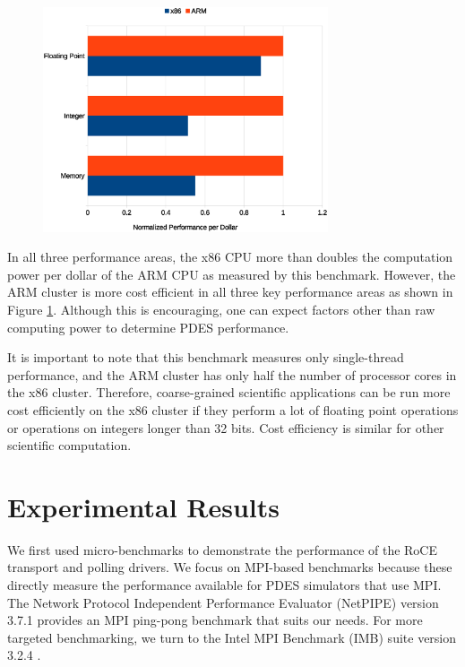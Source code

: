 \documentclass[11pt]{book}
\begin{document}
\begin{figure}
\centering
\includegraphics[width=0.75\textwidth]{nbench_cost}
\label{nbench-cost}
\end{figure}

In all three performance areas, the x86 CPU more than doubles the computation power per
dollar of the ARM CPU as measured by this benchmark.  However, the ARM cluster is more
cost efficient in all three key performance areas as shown in Figure
\ref{nbench-cost}. Although this is encouraging, one can expect factors other than raw
computing power to determine PDES performance.

It is important to note that this benchmark measures only single-thread performance, and
the ARM cluster has only half the number of processor cores in the x86 cluster. Therefore,
coarse-grained scientific applications can be run more cost efficiently on the x86 cluster
if they perform a lot of floating point operations or operations on integers longer than
32 bits. Cost efficiency is similar for other scientific computation.

\chapter{Experimental Results}\label{results}

We first used micro-benchmarks to demonstrate the performance of the RoCE transport and
polling drivers.  We focus on MPI-based benchmarks because these directly measure the
performance available for PDES simulators that use MPI.  The Network Protocol Independent
Performance Evaluator (NetPIPE) \cite{NetPIPE} version 3.7.1 provides an MPI ping-pong
benchmark that suits our needs.  For more targeted benchmarking, we turn to the Intel MPI
Benchmark (IMB) suite version 3.2.4 \cite{intel-mpi}.
\end{document}
